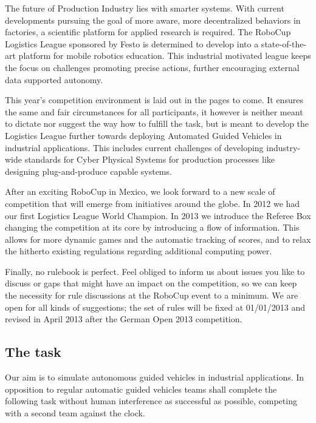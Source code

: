 \documentclass[12pt,twoside]{article}
\begin{document}
The future of Production Industry lies with smarter systems.  With
current developments pursuing the goal of more aware, more
decentralized behaviors in factories, a scientific platform for
applied research is required.  The RoboCup Logistics League sponsored
by Festo is determined to develop into a state-of-the-art platform for
mobile robotics education. This industrial motivated league keeps the
focus on challenges promoting precise actions, further encouraging
external data supported autonomy.

This year's competition environment is laid out in the pages to come.
It ensures the same and fair circumstances for all participants, it
however is neither meant to dictate nor suggest the way how to fulfill
the task, but is meant to develop the Logistics League further towards
deploying Automated Guided Vehicles in industrial applications. This
includes current challenges of developing industry-wide standards for
Cyber Physical Systems for production processes like designing
plug-and-produce capable systems.

After an exciting RoboCup in Mexico, we look forward to a new scale of
competition that will emerge from initiatives around the globe. In
2012 we had our first Logistics League World Champion.  In 2013 we
introduce the Referee Box changing the competition at its core by
introducing a flow of information.  This allows for more dynamic games
and the automatic tracking of scores, and to relax the hitherto
existing regulations regarding additional computing power.

Finally, no rulebook is perfect. Feel obliged to inform us about
issues you like to discuss or gaps that might have an impact on the
competition, so we can keep the necessity for rule discussions at the
RoboCup event to a minimum. We are open for all kinds of suggestions;
the set of rules will be fixed at 01/01/2013 and revised in April 2013
after the German Open 2013 competition.

\subsection{The task}
\label{sec:task}

Our aim is to simulate autonomous guided vehicles in industrial
applications. In opposition to regular automatic guided vehicles teams
shall complete the following task without human interference as
successful as possible, competing with a second team against the
clock.
\end{document}
